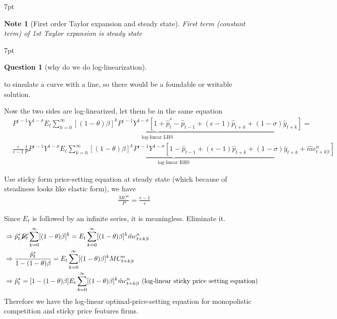 \documentclass{article}
\newenvironment{blueblock}{
\def\FrameCommand{
  \hspace{1pt}
    {\color{DarkBlue}
    \vrule width 2pt}
    {\color{blueshade}
    \vrule width 4pt}
  \colorbox{blueshade}
}
\MakeFramed{
  \advance
  \hsize-
  \width
  \FrameRestore}
\noindent\hspace{-4.55pt}%
\begin{adjustwidth}{}{7pt}
\vspace{2pt}\vspace{2pt}
}
{\vspace{2pt}\end{adjustwidth}\endMakeFramed}
\newenvironment{redblock}{
\def\FrameCommand{
  \hspace{1pt}
    {\color{LightCoral}
    \vrule width 2pt}
    {\color{redshade}
    \vrule width 4pt}
  \colorbox{redshade}
}
\MakeFramed{
  \advance
  \hsize-
  \width
  \FrameRestore}
\noindent\hspace{-4.55pt}%
\begin{adjustwidth}{}{7pt}
\vspace{2pt}\vspace{2pt}
}
{\vspace{2pt}\end{adjustwidth}\endMakeFramed}
\newtheorem{question}{Question}
\newtheorem{note}{Note}
\begin{document}
\begin{blueblock}
\begin{note}[First order Taylor expansion and steady state]
First term (constant term) of 1st Taylor expansion is steady state
\end{note}
\end{blueblock}


\begin{redblock}
\begin{question}[why do we do log-linearization]
\end{question}
to simulate a curve with a line, so there would be a foundable or writable solution.
\end{redblock}
Now the two sides are log-linearized, let them be in the same equation
\begin{align}
&\underbrace{P^{\epsilon-1}Y^{1-\sigma}E_{t}\sum\limits_{k=0}^{\infty}[(1-\theta)\beta]^{k}P^{\epsilon-1}Y^{1-\sigma}[ 1+\hat p^{*}_{t}-\hat p_{t-1}+(\epsilon-1)\hat p_{t+k}+(1-\sigma)\hat y_{t+k}]}_{\text{log-linear LHS}}=
\\&\underbrace{\frac{\epsilon}{\epsilon-1} \frac{1}{P} P^{\epsilon-1}Y^{1-\sigma}E_{t}\sum\limits_{k=0}^{\infty}[(1-\theta)\beta]^{k}P^{\epsilon-1}Y^{1-\sigma}[ 1-\hat p_{t-1}+(\epsilon-1)\hat p_{t+k}+(1-\sigma)\hat y_{t+k}+\hat mc_{t+k|t}^{n}]}_{\text{log-linear RHS}}
\end{align}

Use sticky form price-setting equation at steady state (which because of steadiness looks like elastic form), we have 
\begin{align}
& \frac{MC^{n}}{P}=\frac{\epsilon-1}{\epsilon}
\end{align}

Since $E_t$ is followed by an infinite series, it is meaningless. Eliminate it.
\begin{align}
& \Rightarrow \hat p_{t}^{*} \cancel{E_{t}}\sum\limits_{k=0}^{\infty}[(1-\theta)\beta]^{k}=E_{t}\sum\limits_{k=0}^{\infty}[(1-\theta)\beta]^{k} \hat mc^n_{t+k|t}
\\& \Rightarrow \frac{\hat p_t^*}{1-(1-\theta)\beta}=E_{t}\sum\limits_{k=0}^{\infty}[(1-\theta)\beta]^{k}MC^n_{t+k|t}
\\& \Rightarrow \hat p_t^* =[1-(1-\theta)\beta]E_{t}\sum\limits_{k=0}^{\infty}[(1-\theta)\beta]^{k} \hat mc^n_{t+k|t} \text{ (log-linear sticky price setting equation)}
\end{align}
Therefore we have the log-linear optimal-price-setting equation for monopolistic competition and sticky price features firms.
\end{document}
